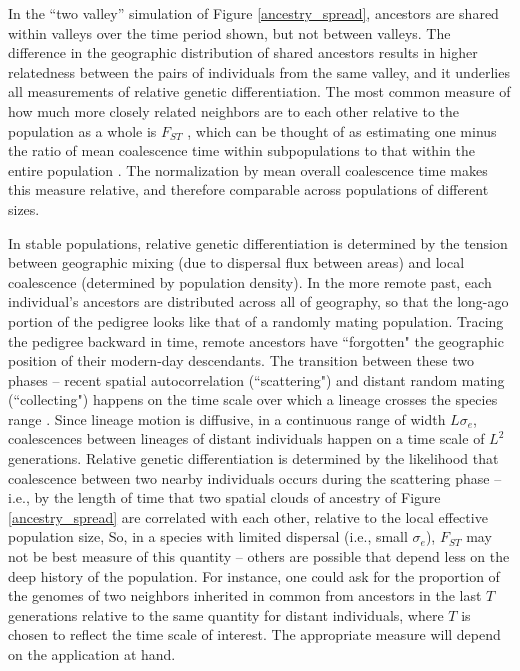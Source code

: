 \documentclass{ar-1col}
\begin{document}
In the ``two valley'' simulation of Figure \ref{ancestry_spread},
ancestors are shared within valleys over the time period shown,
but not between valleys.
The difference in the geographic distribution of shared ancestors 
results in higher relatedness between the pairs of individuals 
from the same valley, 
and it underlies all measurements of relative genetic differentiation.
The most common measure of
how much more closely related neighbors are to each other relative to the population as a whole
is $F_{ST}$ \citep{Wright1951},
which can be thought of as estimating
one minus the ratio of mean coalescence time within subpopulations
to that within the entire population \citep{slatkin_1991inbreeding}.
The normalization by mean overall coalescence time 
makes this measure relative, 
and therefore comparable across populations of different sizes.

In stable populations,
relative genetic differentiation is determined by the tension between 
geographic mixing (due to dispersal flux between areas)
and local coalescence (determined by population density).
In the more remote past, each individual's ancestors are distributed across
all of geography,
so that the long-ago portion of the pedigree looks like that of a randomly mating population.
Tracing the pedigree backward in time, 
remote ancestors have ``forgotten" the geographic position of their 
modern-day descendants.
The transition between these two phases -- recent spatial autocorrelation 
(``scattering") and distant random mating (``collecting")
\citep{Wakeley1999,wilkins2004separationoftimescales}
happens on the time scale over which a lineage crosses the species range \citep{Wakeley1999}.
Since lineage motion is diffusive, in a continuous range of width $L \sigma_e$,
coalescences between lineages of distant individuals happen on a time scale of $L^2$ generations.
Relative genetic differentiation
is determined by the likelihood that coalescence between two nearby individuals
occurs during the scattering phase
-- i.e., by the length of time that two spatial clouds of ancestry of Figure \ref{ancestry_spread}
are correlated with each other,
relative to the local effective population size,
So, in a species with limited dispersal (i.e., small $\sigma_e$),
$F_{ST}$ may not be best measure of this quantity -- 
others are possible that depend less on the deep history of the population.
For instance,
one could ask for the proportion of the genomes of two neighbors 
inherited in common from ancestors in the last $T$ generations
relative to the same quantity for distant individuals,
where $T$ is chosen to reflect the time scale of interest.
The appropriate measure will depend on the application at hand.
\end{document}
